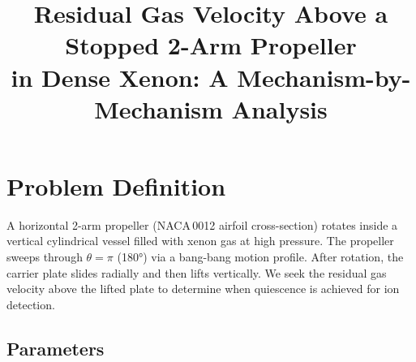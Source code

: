 \documentclass[11pt,a4paper]{article}
\title{Residual Gas Velocity Above a Stopped 2-Arm Propeller\\
       in Dense Xenon: A Mechanism-by-Mechanism Analysis}
\author{}
\date{}
\begin{document}
\maketitle

\section{Problem Definition}
\label{sec:problem}

A horizontal 2-arm propeller (NACA\,0012 airfoil cross-section) rotates
inside a vertical cylindrical vessel filled with xenon gas at high pressure.
The propeller sweeps through $\theta = \pi$ (180°) via a bang-bang motion
profile. After rotation, the carrier plate slides radially and then lifts
vertically. We seek the residual gas velocity above the lifted plate to
determine when quiescence is achieved for ion detection.

\subsection{Parameters}
\end{document}
